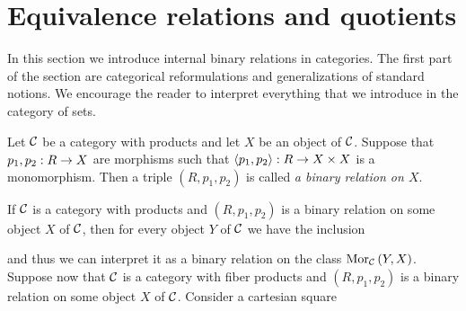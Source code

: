 \section{Equivalence relations and quotients}
\noindent
In this section we introduce internal binary relations in categories. The first part of the section are categorical reformulations and generalizations of standard notions. We encourage the reader to interpret everything that we introduce in the category of sets.

\begin{definition}
Let ${\mathcal C}$ be a category with products and let $X$ be an object of ${\mathcal C}$. Suppose that $p_1,p_2:R\rightarrow X$ are morphisms such that $\langle p_1, p_2\rangle:R\rightarrow X\times X$ is a monomorphism. Then a triple $(R,p_1,p_2)$ is called \textit{a binary relation on $X$}.
\end{definition}
\noindent
If ${\mathcal C}$ is a category with products and $(R,p_1,p_2)$ is a binary relation on some object $X$ of ${\mathcal C}$, then for every object $Y$ of ${\mathcal C}$ we have the inclusion
\begin{center}
\end{center}
and thus we can interpret it as a binary relation on the class $\mathrm{Mor}_{{\mathcal C}}\left(Y,X\right)$.\\
Suppose now that ${\mathcal C}$ is a category with fiber products and $(R,p_1,p_2)$ is a binary relation on some object $X$ of ${\mathcal C}$. Consider a cartesian square
\begin{center}
\end{center}
